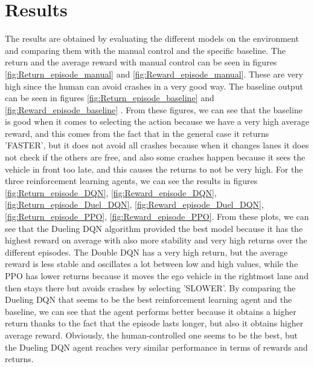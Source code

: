\documentclass{article}
\begin{document}
\section{Results}\label{section:Results}
The results are obtained by evaluating the different models on the environment and comparing them with the manual control and the specific baseline. The return and the average reward with manual control can be seen in figures \ref{fig:Return_episode_manual} and \ref{fig:Reward_episode_manual}. These are very high since the human can avoid crashes in a very good way.
The baseline output can be seen in figures \ref{fig:Return_episode_baseline} and \ref{fig:Reward_episode_baseline} . From these figures, we can see that the baseline is good when it comes to selecting the action because we have a very high average reward, and this comes from the fact that in the general case it returns 'FASTER', but it does not avoid all crashes because when it changes lanes it does not check if the others are free, and also some crashes happen because it sees the vehicle in front too late, and this causes the returns to not be very high.
For the three reinforcement learning agents, we can see the results in figures \ref{fig:Return_episode_DQN}, \ref{fig:Reward_episode_DQN}, \ref{fig:Return_episode_Duel_DQN}, \ref{fig:Reward_episode_Duel_DQN}, \ref{fig:Return_episode_PPO}, \ref{fig:Reward_episode_PPO}. From these plots, we can see that the Dueling DQN algorithm provided the best model because it has the highest reward on average with also more stability and very high returns over the different episodes. The Double DQN has a very high return, but the average reward is less stable and oscillates a lot between low and high values, while the PPO has lower returns because it moves the ego vehicle in the rightmost lane and then stays there but avoids crashes by selecting 'SLOWER'.
By comparing the Dueling DQN that seems to be the best reinforcement learning agent and the baseline, we can see that the agent performs better because it obtains a higher return thanks to the fact that the episode lasts longer, but also it obtains higher average reward. Obviously, the human-controlled one seems to be the best, but the Dueling DQN agent reaches very similar performance in terms of rewards and returns.
\end{document}
